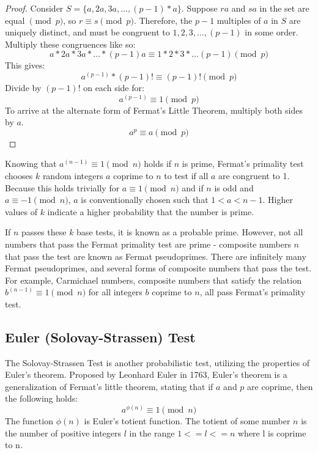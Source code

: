 \documentclass{article}
\begin{document}
\begin{proof} %
Consider $S = \{a, 2a, 3a, \ldots{}, (p - 1) * a\}$.
Suppose $ra$ and $sa$ in the set are equal $\pmod{p}$, so $r \equiv s \pmod{p}$.
Therefore, the $p - 1$ multiples of $a$ in $S$ are uniquely distinct, and must be congruent to ${1, 2, 3, \ldots{}, (p - 1)}$ in some order.
Multiply these congruences like so:
    \[a * 2a * 3a * \ldots{} * (p - 1)a \equiv 1 * 2 * 3 * \ldots{} (p - 1) \pmod{p}\]
This gives:
    \[a^{(p - 1)} * (p - 1)! \equiv (p - 1)! \pmod{p}\]
Divide by $(p - 1)!$ on each side for:
    \[a^{(p - 1)} \equiv 1 \pmod{p}\]
To arrive at the alternate form of Fermat's Little Theorem, multiply both sides by $a$.
    \[a^p \equiv a \pmod{p}\]
\end{proof}

Knowing that $a^{(n - 1)} \equiv 1 \pmod{n}$ holds if $n$ is prime, Fermat's primality test chooses $k$ random integers $a$ coprime to $n$ to test if all $a$ are congruent to 1. Because this holds trivially for $a \equiv 1 \pmod{n}$ and if $n$ is odd and $a \equiv -1 \pmod{n}$, $a$ is conventionally chosen such that $1 < a < n - 1$. Higher values of $k$ indicate a higher probability that the number is prime.

If $n$ passes these $k$ base tests, it is known as a probable prime. However, not all numbers that pass the Fermat primality test are prime - composite numbers $n$ that pass the test are known as Fermat pseudoprimes. There are infinitely many Fermat pseudoprimes, and several forms of composite numbers that pass the test. For example, Carmichael numbers, composite numbers that satisfy the relation $b^{(n-1)} \equiv 1 \pmod{n}$ for all integers $b$ coprime to $n$, all pass Fermat's primality test.

\subsection{Euler (Solovay-Strassen) Test} %
The Solovay-Strassen Test is another probabilistic test, utilizing the properties of Euler's theorem. Proposed by Leonhard Euler in 1763, Euler's theorem is a generalization of Fermat's little theorem, stating that if $a$ and $p$ are coprime, then the following holds:
\[
    a^{\phi(n)} \equiv 1 \pmod{n}
\]
The function $\phi(n)$ is Euler's totient function. The totient of some number $n$ is the number of positive integers $l$ in the range $1 <= l <= n$ where l is coprime to n.
\end{document}
